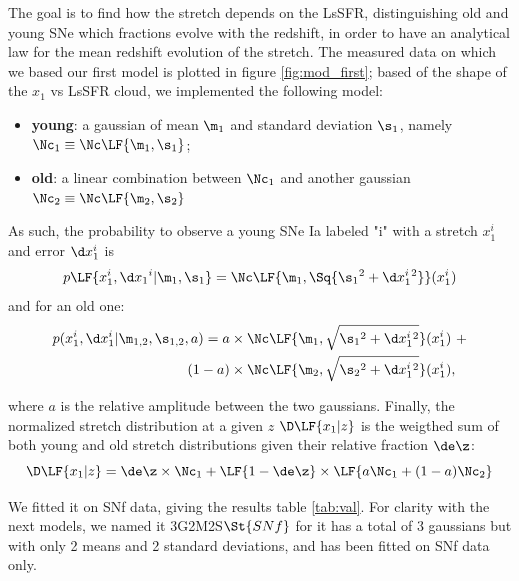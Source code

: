 \documentclass[bibnumber]{aa}
\begin{document}
The goal is to find how the stretch depends on the LsSFR, distinguishing old and
young SNe which fractions evolve with the redshift, in order to have an
analytical law for the mean redshift evolution of the stretch. The measured data
on which we based our first model is plotted in figure \ref{fig:mod_first};
based of the shape of the $x_1$ vs LsSFR cloud, we implemented the following
model:
\begin{itemize}
    \item \textbf{young}: a gaussian of mean $\m_1$ and standard deviation
        $\s_1$, namely $\Nc_1 \equiv \Nc \LF{\m_1,\s_1}$;
    \item \textbf{old}: a linear combination between $\Nc_1$ and another
        gaussian $\Nc_2 \equiv \Nc \LF{\m_2,\s_2}$
\end{itemize}
As such, the probability to observe a young SNe Ia labeled "i" with a stretch
$x_1^i$ and error $\d x_1^i$ is
\begin{equation}
    p \LF{x_1^i, \d x_1{}^i|\m_1,\s_1} = \Nc \LF{\m_1, \Sq{\s_1{}^2 + \d
    x_1^i{}^2}}(x_1^i)
\end{equation}
and for an old one:
\begin{align}
    p(x_1^i, \d x_1^i | \m_{1,2}, \s_{1,2}, a) = a & \times \Nc \LF{\m_1,
    \sqrt{\s_1{}^2 + \d x_1^i{}^{2}}} (x_1^i) \ + \\ (1-a) & \times \Nc
    \LF{\m_2, \sqrt{ \s_2{}^2 + \d x_1^i{}^{2}}} (x_1^i), \nonumber 
\end{align}

\noindent where $a$ is the relative amplitude between the two gaussians.
Finally, the normalized stretch distribution at a given $z$ $\D\LF{x_1|z}$ is
the weigthed sum of both young and old stretch distributions given their
relative fraction $\de\z$:
\begin{equation}
    \D\LF{x_1|z} = \de\z\times\Nc_1 +
    \LF{1-\de\z} \times \LF{a\Nc_1 + (1-a)\Nc_2}
\end{equation}

We fitted it on SNf data, giving the results table \ref{tab:val}. For clarity
with the next models, we named it 3G2M2S$\St{SNf}$ for it has a total of 3
gaussians but with only 2 means and 2 standard deviations, and has been fitted
on SNf data only. 
\end{document}
